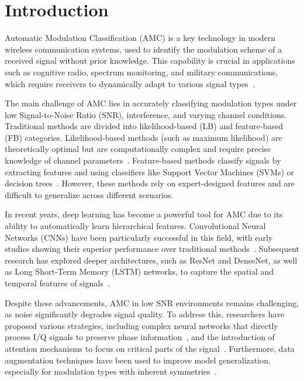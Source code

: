 \documentclass[conference]{IEEEtran}
\begin{document}
\section{Introduction}
Automatic Modulation Classification (AMC) is a key technology in modern wireless communication systems, used to identify the modulation scheme of a received signal without prior knowledge. This capability is crucial in applications such as cognitive radio, spectrum monitoring, and military communications, which require receivers to dynamically adapt to various signal types~\cite{dobre2007survey}.

The main challenge of AMC lies in accurately classifying modulation types under low Signal-to-Noise Ratio (SNR), interference, and varying channel conditions. Traditional methods are divided into likelihood-based (LB) and feature-based (FB) categories. Likelihood-based methods (such as maximum likelihood) are theoretically optimal but are computationally complex and require precise knowledge of channel parameters~\cite{hameed2009likelihood}. Feature-based methods classify signals by extracting features and using classifiers like Support Vector Machines (SVMs) or decision trees~\cite{hazza2013overview}. However, these methods rely on expert-designed features and are difficult to generalize across different scenarios.

In recent years, deep learning has become a powerful tool for AMC due to its ability to automatically learn hierarchical features. Convolutional Neural Networks (CNNs) have been particularly successful in this field, with early studies showing their superior performance over traditional methods~\cite{oshea2016convolutional}. Subsequent research has explored deeper architectures, such as ResNet and DenseNet, as well as Long Short-Term Memory (LSTM) networks, to capture the spatial and temporal features of signals~\cite{west2017deep,rajendran2018deep}.

Despite these advancements, AMC in low SNR environments remains challenging, as noise significantly degrades signal quality. To address this, researchers have proposed various strategies, including complex neural networks that directly process I/Q signals to preserve phase information~\cite{xu2025ldcvnn}, and the introduction of attention mechanisms to focus on critical parts of the signal~\cite{ma2023hfecnetca}. Furthermore, data augmentation techniques have been used to improve model generalization, especially for modulation types with inherent symmetries~\cite{zhang2023efficient}.
\end{document}
